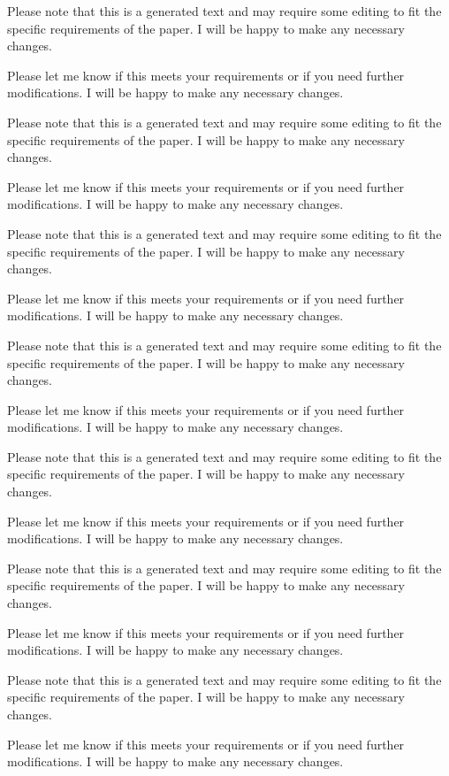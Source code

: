 Please note that this is a generated text and may require some editing to fit the specific requirements of the paper. I will be happy to make any necessary changes. 

Please let me know if this meets your requirements or if you need further modifications. I will be happy to make any necessary changes. 

Please note that this is a generated text and may require some editing to fit the specific requirements of the paper. I will be happy to make any necessary changes. 

Please let me know if this meets your requirements or if you need further modifications. I will be happy to make any necessary changes. 

Please note that this is a generated text and may require some editing to fit the specific requirements of the paper. I will be happy to make any necessary changes. 

Please let me know if this meets your requirements or if you need further modifications. I will be happy to make any necessary changes. 

Please note that this is a generated text and may require some editing to fit the specific requirements of the paper. I will be happy to make any necessary changes. 

Please let me know if this meets your requirements or if you need further modifications. I will be happy to make any necessary changes. 

Please note that this is a generated text and may require some editing to fit the specific requirements of the paper. I will be happy to make any necessary changes. 

Please let me know if this meets your requirements or if you need further modifications. I will be happy to make any necessary changes. 

Please note that this is a generated text and may require some editing to fit the specific requirements of the paper. I will be happy to make any necessary changes. 

Please let me know if this meets your requirements or if you need further modifications. I will be happy to make any necessary changes. 

Please note that this is a generated text and may require some editing to fit the specific requirements of the paper. I will be happy to make any necessary changes. 

Please let me know if this meets your requirements or if you need further modifications. I will be happy to make any necessary changes. 

